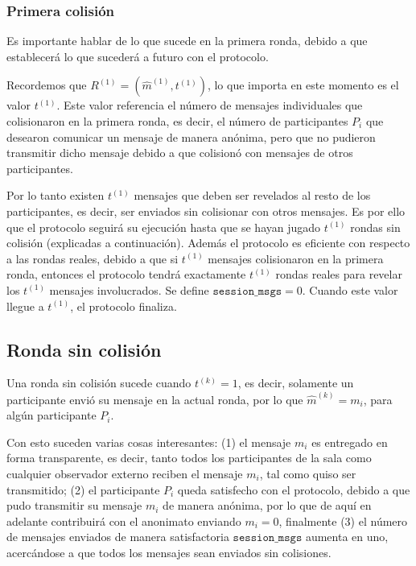 \subsubsection{Primera colisión}

Es importante hablar de lo que sucede en la primera ronda, debido a que establecerá lo 
que sucederá a futuro con el protocolo.

Recordemos que $R^{(1)} = (\hat{m}^{(1)}, t^{(1)})$, lo que importa en este momento es 
el valor $t^{(1)}$. Este valor referencia el número de mensajes individuales que 
colisionaron en la primera ronda, es decir, el número de participantes $P_i$ que desearon 
comunicar un mensaje de manera anónima, pero que no pudieron transmitir dicho mensaje 
debido a que colisionó con mensajes de otros participantes.

Por lo tanto existen $t^{(1)}$ mensajes que deben ser revelados al resto de los 
participantes, es decir, ser enviados sin colisionar con otros mensajes. Es por ello que 
el protocolo seguirá su ejecución hasta que se hayan jugado $t^{(1)}$ rondas sin colisión 
(explicadas a continuación). Además el protocolo es eficiente con respecto a las rondas 
reales, debido a que si $t^{(1)}$ mensajes colisionaron en la primera ronda, entonces el 
protocolo tendrá exactamente $t^{(1)}$ rondas reales para revelar los $t^{(1)}$ mensajes 
involucrados. Se define $\mathtt{session\_msgs} = 0$. Cuando este valor llegue a $t^{(1)}$, 
el protocolo finaliza.

\subsection{Ronda sin colisión}

Una ronda sin colisión sucede cuando $t^{(k)} = 1$, es decir, solamente un participante 
envió su mensaje en la actual ronda, por lo que $\hat{m}^{(k)} = m_i$, para algún 
participante $P_i$.

Con esto suceden varias cosas interesantes: (1) el mensaje $m_i$ es entregado en forma 
transparente, es decir, tanto todos los participantes de la sala como cualquier observador 
externo reciben el mensaje $m_i$, tal como quiso ser transmitido; (2) el participante $P_i$ 
queda satisfecho con el protocolo, debido a que pudo transmitir su mensaje $m_i$ de manera 
anónima, por lo que de aquí en adelante contribuirá con el anonimato enviando $m_i = 0$, 
finalmente (3) el número de mensajes enviados de manera satisfactoria $\mathtt{session\_msgs}$ 
aumenta en uno, acercándose a que todos los mensajes sean enviados sin colisiones.

